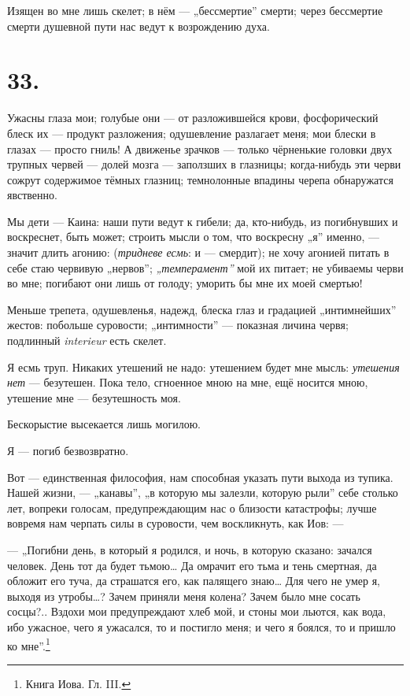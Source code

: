 \documentclass[12pt,a4paper,oneside]{book}
\begin{document}
Изящен во мне лишь скелет; в нём — „бессмертие” смерти; через бессмертие смерти душевной пути нас ведут к возрождению духа.

\section*{33.}

Ужасны глаза мои; голубые они — от разложившейся крови, фосфорический блеск их — продукт разложения; одушевление разлагает меня; мои блески в глазах — просто гниль! А движенье зрачков — только чёрненькие головки двух трупных червей — долей мозга — заползших в глазницы; когда-нибудь эти черви сожрут содержимое тёмных глазниц; темнолонные впадины черепа обнаружатся явственно.

Мы дети — Каина: наши пути ведут к гибели; да, кто-нибудь, из погибнувших и воскреснет, быть может; строить мысли о том, что воскресну „я” именно, — значит длить агонию: (\emph{тридневе есмь}: и — смердит); не хочу агонией питать в себе стаю червивую „нервов”; \emph{„темперамент”} мой их питает; не убиваемы черви во мне; погибают они лишь от голоду; уморить бы мне их моей смертью!

Меньше трепета, одушевленья, надежд, блеска глаз и градацией „интимнейших” жестов: побольше суровости; „интимности” — показная личина червя; подлинный \emph{interieur} есть скелет.

Я есмь труп. Никаких утешений не надо: утешением будет мне мысль: \emph{утешения нет} — безутешен. Пока тело, сгноенное мною на мне, ещё носится мною, утешение мне — безутешность моя.

Бескорыстие высекается лишь могилою.

Я — погиб безвозвратно.

Вот — единственная философия, нам способная указать пути выхода из тупика. Нашей жизни, — „канавы”, „в которую мы залезли, которую рыли” себе столько лет, вопреки голосам, предупреждающим нас о близости катастрофы; лучше вовремя нам черпать силы в суровости, чем воскликнуть, как Иов: —

— „Погибни день, в который я родился, и ночь, в которую сказано: зачался человек. День тот да будет тьмою… Да омрачит его тьма и тень смертная, да обложит его туча, да страшатся его, как палящего знаю… Для чего не умер я, выходя из утробы…? Зачем приняли меня колена? Зачем было мне сосать сосцы?.. Вздохи мои предупреждают хлеб мой, и стоны мои льются, как вода, ибо ужасное, чего я ужасался, то и постигло меня; и чего я боялся, то и пришло ко мне”.\footnote{Книга Иова. Гл. III.}
\end{document}
